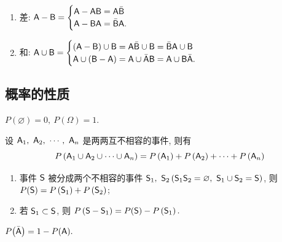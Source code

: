 \begin{theorem}[和差转换]
    \begin{enumerate}[label=(\arabic{*})]
        \item 差: $\mathsf{A}-\mathsf{B}=\begin{cases}
                      \mathsf{A}-\mathsf{A} \mathsf{B}=\mathsf{A} \bar{\mathsf{B}} \\ \mathsf{A}-\mathsf{B} \mathsf{A}=\bar{\mathsf{B}} \mathsf{A}.
                  \end{cases}$
        \item 和: $\mathsf{A} \cup \mathsf{B}=\begin{cases}
                      (\mathsf{A}-\mathsf{B}) \cup \mathsf{B}=\mathsf{A} \bar{\mathsf{B}} \cup \mathsf{B}=\bar{\mathsf{B}} \mathsf{A} \cup \mathsf{B} \\ \mathsf{A} \cup(\mathsf{B}-\mathsf{A})=\mathsf{A} \cup \bar{\mathsf{A}} \mathsf{B}=\mathsf{A} \cup \mathsf{B} \bar{\mathsf{A}}.
                  \end{cases}$
    \end{enumerate}
\end{theorem}

\subsection{概率的性质}

\begin{theorem}
    $P(\varnothing)=0,~ P(\Omega)=1 .$
\end{theorem}

\begin{theorem}[有限可加性]
    设 $ \mathsf{A}_{1},~\mathsf{A}_{2},~\cdots,~\mathsf{A}_{n} $ 是两两互不相容的事件, 则有
    $$P\left(\mathsf{A}_{1} \cup \mathsf{A}_{2} \cup \cdots \cup \mathsf{A}_{n}\right)=P\left(\mathsf{A}_{1}\right)+P\left(\mathsf{A}_{2}\right)+\cdots+P\left(\mathsf{A}_{n}\right)$$
    \begin{enumerate}[label=(\arabic{*})]
        \item 事件 $\mathsf{S}$ 被分成两个不相容的事件 $\mathsf{S}_{1},~\mathsf{S}_{2}\left(\mathsf{S}_{1} \mathsf{S}_{2}=\varnothing,~\mathsf{S}_{1} \cup \mathsf{S}_{2}=\mathsf{S}\right)$, 
        则 $ P(\mathsf{S})=P\left(\mathsf{S}_{1}\right)+P\left(\mathsf{S}_{2}\right)$;
        \item 若 $ \mathsf{S}_{1} \subset \mathsf{S}$, 则 $ P\left(\mathsf{S}-\mathsf{S}_{1}\right)=P(\mathsf{S})-P\left(\mathsf{S}_{1}\right).$
    \end{enumerate}
\end{theorem}

\begin{theorem}[求逆公式]
    $P\qty(\bar{\mathsf{A}})=1-P(\mathsf{A}).$
\end{theorem}

